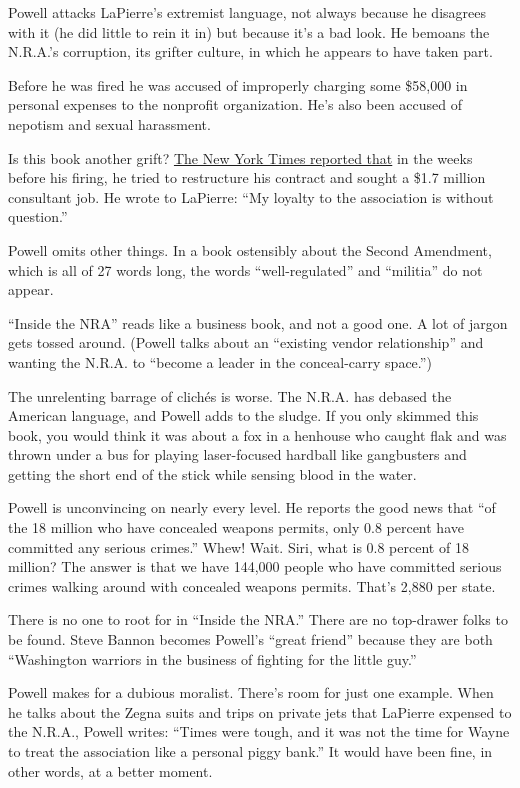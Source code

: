 Powell attacks LaPierre's extremist language, not always because he
disagrees with it (he did little to rein it in) but because it's a bad
look. He bemoans the N.R.A.'s corruption, its grifter culture, in which
he appears to have taken part.

Before he was fired he was accused of improperly charging some \$58,000
in personal expenses to the nonprofit organization. He's also been
accused of nepotism and sexual harassment.

Is this book another grift?
\href{https://www.nytimes3xbfgragh.onion/2020/09/03/us/politics/nra-book-wayne-lapierre.html}{The
New York Times reported that} in the weeks before his firing, he tried
to restructure his contract and sought a \$1.7 million consultant job.
He wrote to LaPierre: ``My loyalty to the association is without
question.''

Powell omits other things. In a book ostensibly about the Second
Amendment, which is all of 27 words long, the words ``well-regulated''
and ``militia'' do not appear.

``Inside the NRA'' reads like a business book, and not a good one. A lot
of jargon gets tossed around. (Powell talks about an ``existing vendor
relationship'' and wanting the N.R.A. to ``become a leader in the
conceal-carry space.'')

The unrelenting barrage of clichés is worse. The N.R.A. has debased the
American language, and Powell adds to the sludge. If you only skimmed
this book, you would think it was about a fox in a henhouse who caught
flak and was thrown under a bus for playing laser-focused hardball like
gangbusters and getting the short end of the stick while sensing blood
in the water.

Powell is unconvincing on nearly every level. He reports the good news
that ``of the 18 million who have concealed weapons permits, only 0.8
percent have committed any serious crimes.'' Whew! Wait. Siri, what is
0.8 percent of 18 million? The answer is that we have 144,000 people who
have committed serious crimes walking around with concealed weapons
permits. That's 2,880 per state.

There is no one to root for in ``Inside the NRA.'' There are no
top-drawer folks to be found. Steve Bannon becomes Powell's ``great
friend'' because they are both ``Washington warriors in the business of
fighting for the little guy.''

Powell makes for a dubious moralist. There's room for just one example.
When he talks about the Zegna suits and trips on private jets that
LaPierre expensed to the N.R.A., Powell writes: ``Times were tough, and
it was not the time for Wayne to treat the association like a personal
piggy bank.'' It would have been fine, in other words, at a better
moment.

